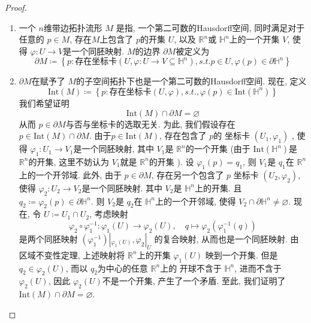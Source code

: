 \documentclass[../main.tex]{subfiles}
\begin{document}
\begin{proof}
   \begin{enumerate}
    \item  一个 \(  n  \)维带边拓扑流形 \(  M  \) 是指, 一个第二可数的Hausdorff空间, 同时满足对于任意的 \(  p \in M  \), 存在\(  M  \)上包含了 \(  p  \)的开集 \(  U  \), 以及 \(  \mathbb{R} ^{n}  \)或 \(  \mathbb{H}^{n}  \)上的一个开集 \(  V  \), 使得 \(   \varphi :U\to V  \)是一个同胚映射.       \(  M  \)的边界 \(   \partial M  \)被定义为  \[
     \partial M\coloneqq \left\{ p: \text{存在} \text{坐标卡}\left(U ,  \varphi :U\to V \subseteq \mathbb{H}^{n}\right), s.t. p \in U,  \varphi \left( p \right)\in  \partial \mathbb{H}^{n}   \right\}
    \]  
    \item \(   \partial M  \)在赋予了 \(  M  \)的子空间拓扑下也是一个第二可数的Hausdorff空间.   现在, 定义 \[
    \mathrm{Int}\left( M \right)\coloneqq \left\{ p: \text{存在坐标卡}\left( U,   \varphi \right), s.t. ,  \varphi \left( p \right)\in \mathrm{Int}\left( \mathbb{H}^{n} \right)    \right\} 
    \]我们希望证明 \[
    \mathrm{Int}\left( M \right)\cap  \partial M= \varnothing 
    \]从而 \(  p \in  \partial M  \)与否与坐标卡的选取无关. 
    为此, 我们假设存在 \(  p \in \mathrm{Int}\left( M \right)\cap  \partial M   \). 由于\( p \in \mathrm{Int}\left( M \right)   \), 存在包含了 \(  p  \)的 坐标卡 \(  \left( U_1, \varphi _1  \right)   \) , 使得 \(   \varphi _1 :U_1\to V_1  \)是一个同胚映射, 其中 \(  V_1  \)是 \(  \mathbb{R} ^{n}  \)的一个开集 (由于 \(  \mathrm{Int}\left( \mathbb{H}^{n} \right)   \)是 \(  \mathbb{R} ^{n}  \)的开集, 这里不妨认为 \(  V_1  \)就是 \(  \mathbb{R} ^{n}  \)的开集    ). 设 \(   \varphi _1 \left( p \right)=  q_1 \), 则 \(  V_1  \)是 \(  q_1  \)在 \(  \mathbb{R} ^{n}  \)上的一个开邻域.    此外, 由于 \(  p \in  \partial M  \), 存在另一个包含了 \(  p  \) 坐标卡 \(  \left( U_2, \varphi _2  \right)   \),     使得 \(   \varphi _2 :U_2\to V_2  \)是一个同胚映射. 其中 \(  V_2  \)是 \(  \mathbb{H}^{n}  \)上的开集. 且 \(  q_2\coloneqq  \varphi _2 \left( p \right)\in  \partial \mathbb{H}^{n}   \). 则  \(  V_2  \)是 \(  q_2  \)在 \(  \mathbb{H}^{n}  \)上的一个开邻域, 使得 \(  V_2\cap  \partial \mathbb{H}^{n}\neq \varnothing  \).   现在, 令 \(  U\coloneqq U_1\cap U_2  \),  考虑映射 \[
     \varphi _2 \circ  \varphi _1 ^{-1} :  \varphi _1 \left( U \right)\to  \varphi _2 \left( U \right)  ,\quad q\mapsto   \varphi _2 \left(  \varphi _1 ^{-1} \left( q \right)  \right) 
    \]      是两个同胚映射 \(  \left(  \varphi _1 ^{-1}  \right)|_{ \varphi _1 \left( U \right) },  \varphi _2 |_{U}   \) 的复合映射, 从而也是一个同胚映射. 由区域不变性定理,  上述映射将 \(  \mathbb{R} ^{n}  \)上的开集 \(   \varphi _1 \left( U \right)   \) 映到一个开集. 但是 \(  q_2 \in  \varphi _2 \left( U \right)   \), 而以 \(  q_2  \)为中心的任意 \(  \mathbb{R} ^{n}  \)上的 开球不含于 \(  \mathbb{H}^{n}  \), 进而不含于  \(   \varphi _2 \left( U \right)   \), 因此 \(   \varphi _2 \left( U \right)   \)不是一个开集, 产生了一个矛盾. 至此, 我们证明了 \(  \mathrm{Int}\left( M \right)\cap  \partial M=  \varnothing   \).     
    

\end{enumerate}
\end{proof}
\end{document}
